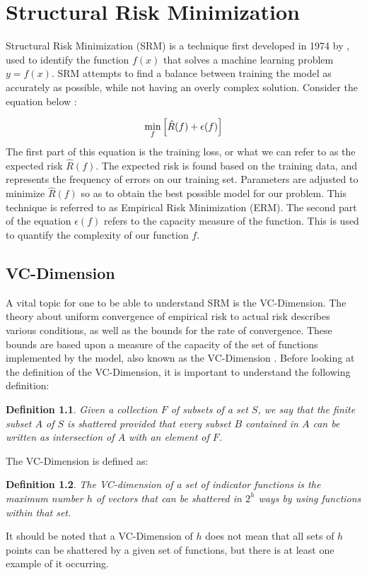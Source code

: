 \chapter{Structural Risk Minimization}
\label{ch:structuralriskminimization}


Structural Risk Minimization (SRM) is a technique first developed in 1974 by \citet{vapnikchervonenkis1}, used to identify the function $f(x)$ that solves a machine learning problem $y=f(x)$. SRM attempts to find a balance between training the model as accurately as possible, while not having an overly complex solution.
\newline
Consider the equation below \citep{srmvapnik512}:

\begin{equation}\label{srm1}
\centering
\min_{f}{\left[\hat{R}(f)+\epsilon(f)\right]}
\end{equation}
\newline
The first part of this equation is the training loss, or what we can refer to as the expected risk $\hat{R}(f)$. The expected risk is found based on the training data, and represents the frequency of errors on our training set. Parameters are adjusted to minimize $\hat{R}(f)$ so as to obtain the best possible model for our problem. This technique is referred to as Empirical Risk Minimization (ERM). The second part of the equation $\epsilon(f)$ refers to the capacity measure of the function. This is used to quantify the complexity of our function $f$.

\section {VC-Dimension} \label{sec:vc-dimension}

A vital topic for one to be able to understand SRM is the VC-Dimension. The theory about uniform convergence of empirical risk to actual risk describes various conditions, as well as the bounds for the rate of convergence. These bounds are based upon a measure of the capacity of the set of functions implemented by the model, also known as the VC-Dimension \citep{srmvapnik506}. Before looking at the definition of the VC-Dimension, it is important to understand the following definition:

\newtheorem{definition}{Definition}
\begin{definition} \label{shatterdefn}
Given a collection $F$ of subsets of a set $S$, we say that the finite subset $A$ of $S$ is shattered provided that every subset $B$ contained in $A$ can be written as intersection of $A$ with an element of $F$. 
\end {definition}
The VC-Dimension is defined\citep{srmvapnik506} as:
\begin{definition} \label{vcdimdefn}
The VC-dimension of a set of indicator functions is the maximum number $h$ of vectors that can be shattered in $2^{h}$ ways by using functions within that set. 
\end {definition}
It should be noted that a VC-Dimension of $h$ does not mean that all sets of $h$ points can be shattered by a given set of functions, but there is at least one example of it occurring.


